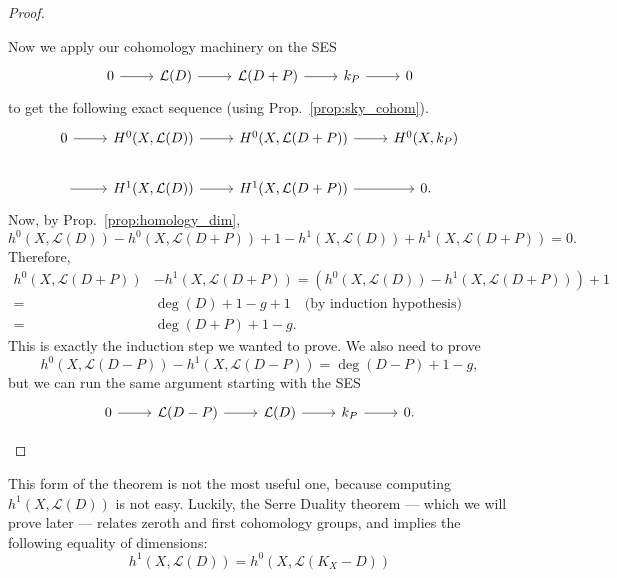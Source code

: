 \documentclass[12pt]{article}
\begin{document}
\begin{proof}
\begin{description}[style=nextline]
          Now we apply our cohomology machinery on the SES
          \[
          \begin{tikzcd}
            0\arrow{r} & \mathcal{L}(D)\arrow{r} & \mathcal{L}(D+P)\arrow{r}
            & k_{P}\arrow{r} & 0
          \end{tikzcd}
          \]
          to get the following exact sequence (using
          Prop.~\ref{prop:sky_cohom}).
          \[
          \begin{tikzcd}
            0\arrow{r} & H^{0}(X, \mathcal{L}(D))\arrow{r}
            & H^{0}(X, \mathcal{L}(D+P))\arrow{r}
            & H^{0}(X, k_{P}) \\
            \arrow{r} & H^{1}(X, \mathcal{L}(D))\arrow{r}
            & H^{1}(X, \mathcal{L}(D+P))\arrow{r} & 0.
          \end{tikzcd}
          \]
          Now, by Prop.~\ref{prop:homology_dim},
          \[
          h^{0}(X,\mathcal{L}(D))-h^{0}(X, \mathcal{L}(D+P))
          +1-h^{1}(X,\mathcal{L}(D))+h^{1}(X,\mathcal{L}(D+P)) = 0.
          \]
          Therefore,
          \begin{align*}
            h^{0}(X,\mathcal{L}(D+P))&-h^{1}(X,\mathcal{L}(D+P))
            =\left(h^{0}(X,\mathcal{L}(D))-h^{1}(X,\mathcal{L}(D+P))\right)
              +1 \\
            =&\deg(D)+1-g+1\quad\text{(by induction hypothesis)} \\
            =&\deg(D+P)+1-g.
          \end{align*}
          This is exactly the induction step we wanted to prove.
          We also need to prove
          \[
            h^{0}(X,\mathcal{L}(D-P))-h^{1}(X,\mathcal{L}(D-P))
            =\deg(D-P)+1-g,
          \]
          but we can run the same argument starting with the SES
          \[
          \begin{tikzcd}
            0\arrow{r} & \mathcal{L}(D-P)\arrow{r} & \mathcal{L}(D)\arrow{r}
            & k_{P}\arrow{r} & 0.
          \end{tikzcd}
          \]
  \end{description}
\end{proof}

This form of the theorem is not the most useful one, because computing
$h^{1}(X,\mathcal{L}(D))$ is not easy. Luckily, the Serre Duality theorem
--- which we will prove later --- relates zeroth and first cohomology
groups, and implies the following equality of dimensions:
\[h^{1}(X,\mathcal{L}(D))=h^{0}(X,\mathcal{L}(K_{X}-D))\]
\end{document}
